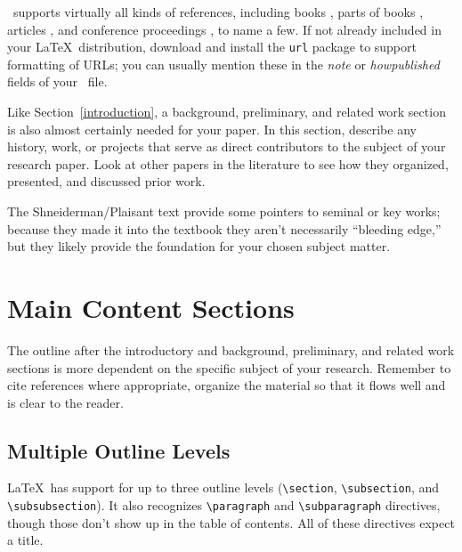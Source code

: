 \documentclass{article}
\begin{document}
\BibTeX\ supports virtually all kinds of references, including books \cite{dui,sgg,iokit,palmos}, parts of books \cite{userModeLinux}, articles \cite{nielsen:dui-review,heer-shneiderman,stackableThreads,xpkernel}, and conference proceedings \cite{ux-3d,iring,contextFileSearch,osHaskell,hibernator}, to name a few.  If not already included in your \LaTeX\ distribution, download and install the \texttt{url} package to support formatting of URLs; you can usually mention these in the \emph{note} or \emph{howpublished} fields of your \BibTeX\ file.

Like Section~\ref{introduction}, a background, preliminary, and related work section is also almost certainly needed for your paper.  In this section, describe any history, work, or projects that serve as direct contributors to the subject of your research paper.  Look at other papers in the literature to see how they organized, presented, and discussed prior work.

The Shneiderman/Plaisant text \cite{dui} provide some pointers to seminal or key works; because they made it into the textbook they aren't necessarily ``bleeding edge,'' but they likely provide the foundation for your chosen subject matter.

\section{Main Content Sections}

The outline after the introductory and background, preliminary, and related work sections is more dependent on the specific subject of your research.  Remember to cite references where appropriate, organize the material so that it flows well and is clear to the reader.

\subsection{Multiple Outline Levels}

\LaTeX\ has support for up to three outline levels (\verb!\section!, \verb!\subsection!, and \verb!\subsubsection!).  It also recognizes \verb!\paragraph! and \verb!\subparagraph! directives, though those don't show up in the table of contents.  All of these directives expect a title.
\end{document}
